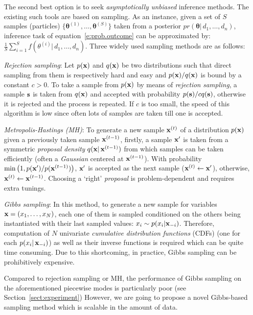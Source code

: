 The second best option is to seek \emph{asymptotically unbiased} inference methods. 
The existing such tools are based on sampling.
As an instance, given a set of $S$ samples (particles) $\{\boldsymbol\theta^{(1)}, \ldots, \boldsymbol\theta^{(S)}\}$ taken from a posterior $pr(\boldsymbol\theta | \, d_1, \ldots, d_n)$, 
inference task of equation~\ref{e:prob.outcome} can be approximated by: 
$\frac{1}{S} \sum_{i=1}^S f(\theta^{(i)} | \, d_1, \ldots, d_n)$.
Three widely used sampling methods are as follows:

\emph{Rejection sampling}:
Let $p(\textbf{x})$ and $q(\textbf{x})$ be two distributions 
such that direct sampling from them is respectively hard and easy
and
$p(\textbf{x})/q(\textbf{x})$ is bound by a constant $c>0$. 
To take a sample from $p(\textbf{x})$ by means of \emph{rejection sampling}, 
a sample $\textbf{s}$ is taken from $q(\textbf{x})$ and accepted with probability $p(\textbf{s}) / c q(\textbf{s})$, 
otherwise it is rejected and the process is repeated. 
If $c$ is too small, the speed of this algorithm is low since often lots of samples are taken till one is accepted.

\emph{Metropolis-Hastings (MH)}:
To generate a new sample $\textbf{x}^{(t)}$ of a distribution $p(\textbf{x})$ given a previously taken sample $\textbf{x}^{(t-1)}$, 
firstly, a sample $\textbf{x}'$ is taken 
from a symmetric \emph{proposal density} $q(\textbf{x} |\, \textbf{x}^{(t-1)})$ 
from which samples can be taken efficiently 
(often a \emph{Gaussian} centered at $\textbf{x}^{(t-1)}$). 
With probability $\min \big(1, p(\textbf{x}')/p(\textbf{x}^{(t-1)}) \big)$, 
$\textbf{x}'$ is accepted as the next sample ($\textbf{x}^{(t)} \leftarrow \textbf{x}'$), otherwise, $\textbf{x}^{(t)} \leftarrow \textbf{x}^{(t-1)}$. 
Choosing a `right' \emph{proposal} is problem-dependent and requires extra tunings. 


\emph{Gibbs sampling}:
In this method, to generate a new sample for variables $\textbf{x} = (x_1, \ldots, x_N)$, 
each one of them is sampled conditioned on the others being instantiated with their last sampled values:
$x_i \sim p(x_i | \textbf{x}_{-i})$. 
Therefore,  
computation of $N$ univariate \emph{cumulative distribution functions} (CDFs) 
(one for each $p(x_i | \, \textbf{x}_{-i})$) as well as their inverse functions is required which can be quite time consuming. 
Due to this shortcoming, in practice, Gibbs sampling can be prohibitively expensive.   

Compared to rejection sampling or MH, the performance of Gibbs sampling on the aforementioned piecewise modes is particularly poor (see Section~\ref{sect:experiment})
However,  we are going to propose a novel Gibbs-based sampling method which is scalable in the amount of data.

